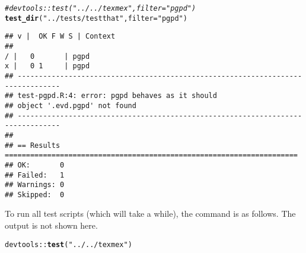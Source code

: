 \documentclass[a4paper]{article}\usepackage[]{graphicx}\usepackage[]{color}
\makeatletter
\newcommand{\hlstr}[1]{\textcolor[rgb]{0.192,0.494,0.8}{#1}}%
\newcommand{\hlcom}[1]{\textcolor[rgb]{0.678,0.584,0.686}{\textit{#1}}}%
\newcommand{\hlopt}[1]{\textcolor[rgb]{0,0,0}{#1}}%
\newcommand{\hlstd}[1]{\textcolor[rgb]{0.345,0.345,0.345}{#1}}%
\newcommand{\hlkwc}[1]{\textcolor[rgb]{0.333,0.667,0.333}{#1}}%
\newcommand{\hlkwd}[1]{\textcolor[rgb]{0.737,0.353,0.396}{\textbf{#1}}}%
\newenvironment{kframe}{%
 \def\at@end@of@kframe{}%
 \ifinner\ifhmode%
  \def\at@end@of@kframe{\end{minipage}}%
  \begin{minipage}{\columnwidth}%
 \fi\fi%
 \def\FrameCommand##1{\hskip\@totalleftmargin \hskip-\fboxsep
 \colorbox{shadecolor}{##1}\hskip-\fboxsep
     \hskip-\linewidth \hskip-\@totalleftmargin \hskip\columnwidth}%
 \MakeFramed {\advance\hsize-\width
   \@totalleftmargin\z@ \linewidth\hsize
   \@setminipage}}%
 {\par\unskip\endMakeFramed%
 \at@end@of@kframe}
\newenvironment{knitrout}{}{} %
\makeatother
\begin{document}
\begin{knitrout}
\color{fgcolor}\begin{kframe}
\begin{alltt}
\hlcom{#devtools::test("../../texmex",filter="pgpd")}
\hlkwd{test_dir}\hlstd{(}\hlstr{"../tests/testthat"}\hlstd{,} \hlkwc{filter}\hlstd{=}\hlstr{"pgpd"}\hlstd{)}
\end{alltt}
\begin{verbatim}
## v |  OK F W S | Context
## 
/ |   0       | pgpd
x |   0 1     | pgpd
## --------------------------------------------------------------------------------
## test-pgpd.R:4: error: pgpd behaves as it should
## object '.evd.pgpd' not found
## --------------------------------------------------------------------------------
## 
## == Results =====================================================================
## OK:       0
## Failed:   1
## Warnings: 0
## Skipped:  0
\end{verbatim}
\end{kframe}
\end{knitrout}


To run all test scripts (which will take a while), the command
is as follows.  The output is not shown here.

\begin{knitrout}
\color{fgcolor}\begin{kframe}
\begin{alltt}
\hlstd{devtools}\hlopt{::}\hlkwd{test}\hlstd{(}\hlstr{"../../texmex"}\hlstd{)}
\end{alltt}
\end{kframe}
\end{knitrout}



\end{document}
